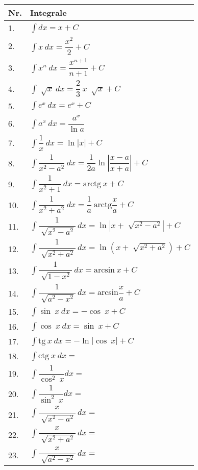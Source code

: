 \documentclass{article}
\begin{document}
\begin{table}[!ht]
\begin{minipage}{0.5\linewidth}
\begin{tabular}{|m{1cm}|m{7cm}|}
\hline
\textbf{Nr.} & \textbf{Integrale} \\
\hline
1. & $\displaystyle\int dx = x + C $ \\
\hline
2. & $\displaystyle\int x\ dx = \dfrac{x^2}{2} + C $ \\
\hline
3. & $\displaystyle\int x^n\ dx = \dfrac{x^{n+1}}{n+1} + C $ \\
\hline
4. & $\displaystyle\int \sqrt[]{x}\ dx = \dfrac{2}{3}\ x\ \sqrt[]{x} + C $ \\
\hline
5. & $\displaystyle\int e^x\ dx = e^x + C $\\
\hline
6. & $\displaystyle\int a^x\ dx = \dfrac{a^x}{\ln a} $\\
\hline
7. & $\displaystyle\int \dfrac{1}{x}\ dx = \ln \left\lvert x \right\rvert + C $\\
\hline
8. & $\displaystyle\int \dfrac{1}{x^2-a^2}\ dx = \dfrac{1}{2a} \ln \left\lvert \dfrac{x-a}{x+a} \right\rvert + C $\\
\hline
9. & $\displaystyle\int \dfrac{1}{x^2+1}\ dx = \text{arctg}\ x + C $ \\
\hline
10. & $\displaystyle\int \dfrac{1}{x^2+a^2}\ dx = \dfrac{1}{a}\ \text{arctg} \dfrac{x}{a} + C $ \\
\hline
11. & $\displaystyle\int \dfrac{1}{\sqrt[]{x^2-a^2}}\ dx = \ln \left\lvert x + \sqrt[]{x^2-a^2} \right\rvert + C $ \\
\hline
12. & $\displaystyle\int \dfrac{1}{\sqrt[]{x^2+a^2}}\ dx = \ln \left( x+\sqrt[]{x^2+a^2} \right) + C $\\
\hline
13. & $\displaystyle\int \dfrac{1}{\sqrt[]{1-x^2}}\ dx = \text{arcsin}\ x + C $\\
\hline
14. & $\displaystyle\int \dfrac{1}{\sqrt[]{a^2-x^2}}\ dx = \text{arcsin} \dfrac{x}{a} + C $\\
\hline
15. & $\displaystyle\int \sin\ x\ dx = -\cos\ x + C $\\
\hline
16. & $\displaystyle\int \cos\ x\ dx = \sin\ x + C $\\
\hline
17. & $\displaystyle\int \text{tg}\ x\ dx = -\ln\left\lvert \cos\ x \right\rvert + C $\\
\hline
18. & $\displaystyle\int \text{ctg}\ x\ dx =  $\\
\hline
19. & $\displaystyle\int \dfrac{1}{\cos ^2\ x} dx =  $\\
\hline
20. & $\displaystyle\int \dfrac{1}{\sin ^2\ x} dx =  $\\
\hline
21. & $\displaystyle\int \dfrac{x}{\sqrt[]{x^2-a^2}}\ dx =  $\\
\hline
22. & $\displaystyle\int \dfrac{x}{\sqrt[]{x^2+a^2}}\ dx =  $\\
\hline
23. & $\displaystyle\int \dfrac{x}{\sqrt[]{a^2-x^2}}\ dx =  $\\
\hline
\end{tabular}
\end{minipage}
\end{table}
\end{document}
